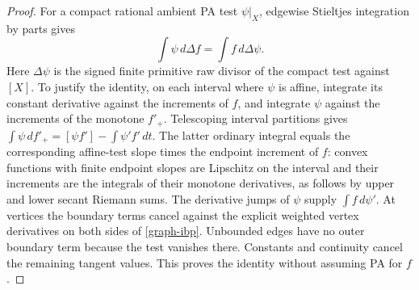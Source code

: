 \documentclass[11pt]{article}
\begin{document}
\begin{proof}
For a compact rational ambient PA test $\psi|_X$, edgewise Stieltjes
integration by parts gives
\begin{equation}\label{graph-ibp}
 \int\psi\,d\Delta f=\int f\,d\Delta\psi.
\end{equation}
Here $\Delta\psi$ is the signed finite primitive raw divisor of the
compact test against $[X]$. To justify the identity, on each interval
where $\psi$ is affine, integrate its constant derivative against the
increments of $f$, and integrate $\psi$ against the increments of the
monotone $f'_+$. Telescoping interval partitions gives
$\int\psi\,d f'_+=[\psi f']-\int\psi'f'\,dt$.
The latter ordinary integral equals the corresponding affine-test slope
times the endpoint increment of $f$: convex functions with finite
endpoint slopes are Lipschitz on the interval and their increments are
the integrals of their monotone derivatives, as follows by upper and
lower secant Riemann sums. The derivative jumps of $\psi$ supply
$\int f\,d\psi'$. At vertices the boundary terms cancel against the
explicit weighted vertex derivatives on both sides of
\eqref{graph-ibp}. Unbounded edges have no outer boundary term because
the test vanishes there. Constants and continuity cancel the remaining
tangent values. This proves the identity without assuming PA for $f$.


\end{proof}
\end{document}
